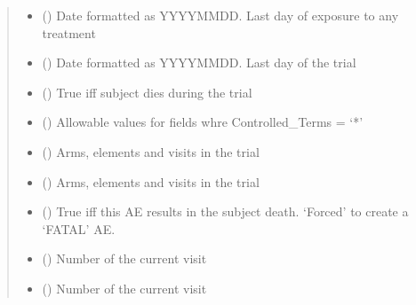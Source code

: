 \documentclass[letterpaper,10pt,english]{sphinxmanual}
\begin{document}
\begin{fulllineitems}
\begin{quote}
\begin{description}
\begin{itemize}
\item {} 
\sphinxAtStartPar
{} () \textendash{} Date formatted as YYYY\sphinxhyphen{}MM\sphinxhyphen{}DD. Last day of exposure to any treatment

\item {} 
\sphinxAtStartPar
{} () \textendash{} Date formatted as YYYY\sphinxhyphen{}MM\sphinxhyphen{}DD. Last day of the trial

\item {} 
\sphinxAtStartPar
{} () \textendash{} True iff subject dies during the trial

\item {} 
\sphinxAtStartPar
{} () \textendash{} Allowable values for fields whre Controlled\_Terms = ‘*’

\item {} 
\sphinxAtStartPar
{} () \textendash{} Arms, elements and visits in the trial

\item {} 
\sphinxAtStartPar
{} () \textendash{} Arms, elements and visits in the trial

\item {} 
\sphinxAtStartPar
{} () \textendash{} True iff this AE results in the subject death. ‘Forced’ to create a ‘FATAL’ AE.

\item {} 
\sphinxAtStartPar
{} () \textendash{} Number of the current visit

\item {} 
\sphinxAtStartPar
{} () \textendash{} Number of the current visit


\end{itemize}
\end{description}
\end{quote}
\end{fulllineitems}
\end{document}

